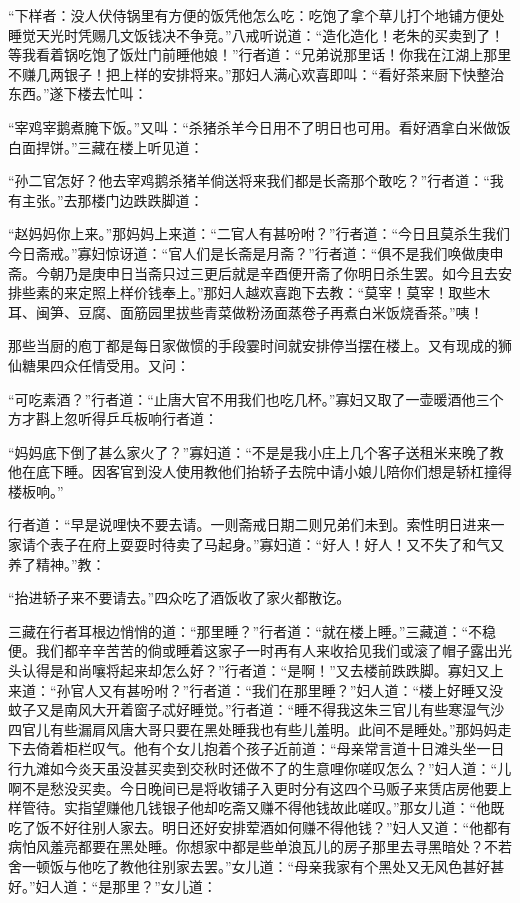 \documentclass[12pt,UTF8]{ctexbook}
\begin{document}
{	“下样者：没人伏侍锅里有方便的饭凭他怎么吃：吃饱了拿个草儿打个地铺方便处睡觉天光时凭赐几文饭钱决不争竞。”八戒听说道：“造化造化！老朱的买卖到了！等我看着锅吃饱了饭灶门前睡他娘！”行者道：“兄弟说那里话！你我在江湖上那里不赚几两银子！把上样的安排将来。”那妇人满心欢喜即叫：“看好茶来厨下快整治东西。”遂下楼去忙叫：
	
	“宰鸡宰鹅煮腌下饭。”又叫：“杀猪杀羊今日用不了明日也可用。看好酒拿白米做饭白面捍饼。”三藏在楼上听见道：
	
	“孙二官怎好？他去宰鸡鹅杀猪羊倘送将来我们都是长斋那个敢吃？”行者道：“我有主张。”去那楼门边跌跌脚道：
	
	“赵妈妈你上来。”那妈妈上来道：“二官人有甚吩咐？”行者道：“今日且莫杀生我们今日斋戒。”寡妇惊讶道：“官人们是长斋是月斋？”行者道：“俱不是我们唤做庚申斋。今朝乃是庚申日当斋只过三更后就是辛酉便开斋了你明日杀生罢。如今且去安排些素的来定照上样价钱奉上。”那妇人越欢喜跑下去教：“莫宰！莫宰！取些木耳、闽笋、豆腐、面筋园里拔些青菜做粉汤面蒸卷子再煮白米饭烧香茶。”咦！
	
	那些当厨的庖丁都是每日家做惯的手段霎时间就安排停当摆在楼上。又有现成的狮仙糖果四众任情受用。又问：
	
	“可吃素酒？”行者道：“止唐大官不用我们也吃几杯。”寡妇又取了一壶暖酒他三个方才斟上忽听得乒乓板响行者道：
	
	“妈妈底下倒了甚么家火了？”寡妇道：“不是是我小庄上几个客子送租米来晚了教他在底下睡。因客官到没人使用教他们抬轿子去院中请小娘儿陪你们想是轿杠撞得楼板响。”
	
	行者道：“早是说哩快不要去请。一则斋戒日期二则兄弟们未到。索性明日进来一家请个表子在府上耍耍时待卖了马起身。”寡妇道：“好人！好人！又不失了和气又养了精神。”教：
	
	“抬进轿子来不要请去。”四众吃了酒饭收了家火都散讫。
	
	三藏在行者耳根边悄悄的道：“那里睡？”行者道：“就在楼上睡。”三藏道：“不稳便。我们都辛辛苦苦的倘或睡着这家子一时再有人来收拾见我们或滚了帽子露出光头认得是和尚嚷将起来却怎么好？”行者道：“是啊！”又去楼前跌跌脚。寡妇又上来道：“孙官人又有甚吩咐？”行者道：“我们在那里睡？”妇人道：“楼上好睡又没蚊子又是南风大开着窗子忒好睡觉。”行者道：“睡不得我这朱三官儿有些寒湿气沙四官儿有些漏肩风唐大哥只要在黑处睡我也有些儿羞明。此间不是睡处。”那妈妈走下去倚着柜栏叹气。他有个女儿抱着个孩子近前道：“母亲常言道十日滩头坐一日行九滩如今炎天虽没甚买卖到交秋时还做不了的生意哩你嗟叹怎么？”妇人道：“儿啊不是愁没买卖。今日晚间已是将收铺子入更时分有这四个马贩子来赁店房他要上样管待。实指望赚他几钱银子他却吃斋又赚不得他钱故此嗟叹。”那女儿道：“他既吃了饭不好往别人家去。明日还好安排荤酒如何赚不得他钱？”妇人又道：“他都有病怕风羞亮都要在黑处睡。你想家中都是些单浪瓦儿的房子那里去寻黑暗处？不若舍一顿饭与他吃了教他往别家去罢。”女儿道：“母亲我家有个黑处又无风色甚好甚好。”妇人道：“是那里？”女儿道：
	
}
\end{document}
